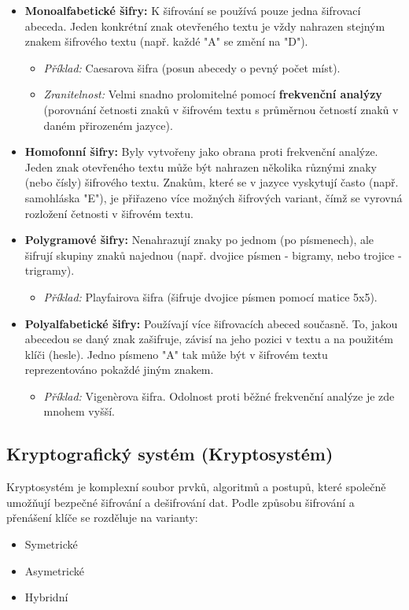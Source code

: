 \begin{itemize}
    \item \textbf{Monoalfabetické šifry:} K šifrování se používá pouze jedna šifrovací abeceda. Jeden konkrétní znak otevřeného textu je vždy nahrazen stejným znakem šifrového textu (např. každé "A" se změní na "D").
    \begin{itemize}
        \item \textit{Příklad:} Caesarova šifra (posun abecedy o pevný počet míst).
        \item \textit{Zranitelnost:} Velmi snadno prolomitelné pomocí \textbf{frekvenční analýzy} (porovnání četnosti znaků v šifrovém textu s průměrnou četností znaků v daném přirozeném jazyce).
    \end{itemize}

    \item \textbf{Homofonní šifry:} Byly vytvořeny jako obrana proti frekvenční analýze. Jeden znak otevřeného textu může být nahrazen několika různými znaky (nebo čísly) šifrového textu. Znakům, které se v jazyce vyskytují často (např. samohláska "E"), je přiřazeno více možných šifrových variant, čímž se vyrovná rozložení četnosti v šifrovém textu.

    \item \textbf{Polygramové šifry:} Nenahrazují znaky po jednom (po písmenech), ale šifrují skupiny znaků najednou (např. dvojice písmen - bigramy, nebo trojice - trigramy).
    \begin{itemize}
        \item \textit{Příklad:} Playfairova šifra (šifruje dvojice písmen pomocí matice 5x5).
    \end{itemize}

    \item \textbf{Polyalfabetické šifry:} Používají více šifrovacích abeced současně. To, jakou abecedou se daný znak zašifruje, závisí na jeho pozici v textu a na použitém klíči (hesle). Jedno písmeno "A" tak může být v šifrovém textu reprezentováno pokaždé jiným znakem.
    \begin{itemize}
        \item \textit{Příklad:} Vigenèrova šifra. Odolnost proti běžné frekvenční analýze je zde mnohem vyšší.
    \end{itemize}
\end{itemize}

\subsection{Kryptografický systém (Kryptosystém)}
Kryptosystém je komplexní soubor prvků, algoritmů a postupů, které společně umožňují bezpečné šifrování a dešifrování dat. Podle způsobu šifrování a přenášení klíče se rozděluje na varianty:
\begin{itemize}
    \item Symetrické
    \item Asymetrické
    \item Hybridní
\end{itemize}

